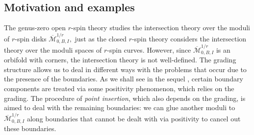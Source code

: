 \documentclass[11pt,a4paper]{article}
\theoremstyle{definition}
\theoremstyle{remark}
\numberwithin{equation}{section}
\def\Mbar{{\overline{\mathcal M}}}
\begin{document}
\subsection{Motivation and examples}
The genus-zero open $r$-spin theory studies the intersection theory over the moduli of $r$-spin disks $\Mbar^{1/r}_{0,B,I},$ just as the closed $r$-spin theory considers the intersection theory over the moduli spaces of $r$-spin curves. However, since $\Mbar^{1/r}_{0,B,I}$ is an orbifold with corners, the intersection theory is not well-defined. The grading structure allows us to deal in different ways with the problems that occur due to the presence of the boundaries.
As we shall see in the sequel \cite{TZ2}, certain boundary components are treated via some positivity phenomenon, which relies on the grading. The procedure of \textit{point insertion}, which also depends on the grading, is aimed to deal with the remaining boundaries: we can glue another moduli to $\Mbar^{1/r}_{0,B,I}$ along boundaries that cannot be dealt with via positivity to cancel out these boundaries. 
\end{document}
